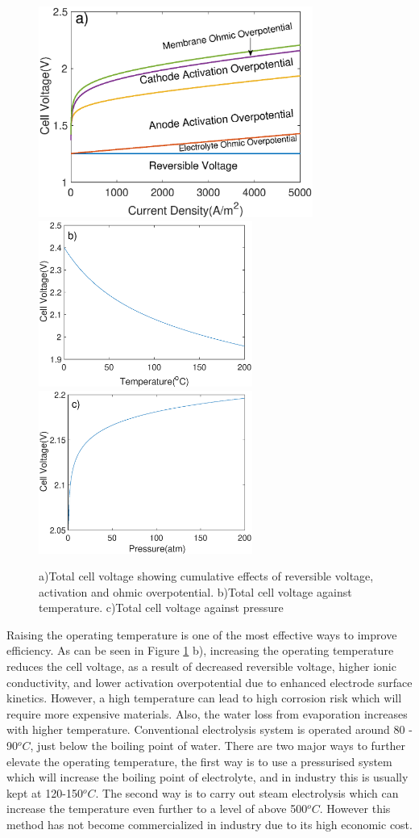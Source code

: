 \begin{figure}[h]
\centering
\includegraphics[width=9cm]{total.eps}
\newline
\includegraphics[width=7cm]{cellT.eps}
\includegraphics[width=7cm]{cellP.eps}
\caption{a)Total cell voltage showing cumulative effects of reversible voltage, activation and ohmic overpotential. b)Total cell voltage against temperature. c)Total cell voltage against pressure}
\label{fig:ni}
\end{figure}
Raising the operating temperature is one of the most effective ways to improve efficiency. As can be seen in Figure \ref{fig:ni} b), increasing the operating temperature reduces the cell voltage, as a result of decreased reversible voltage, higher ionic conductivity, and lower activation overpotential due to enhanced electrode surface kinetics. However, a high temperature can lead to high corrosion risk which will require more expensive materials. Also, the water loss from evaporation increases with higher temperature. Conventional electrolysis system is operated around 80 - 90$^oC$, just below the boiling point of water.\cite{temp} There are two major ways to further elevate the operating temperature, the first way is to use a pressurised system which will increase the boiling point of electrolyte, and in industry this is usually kept at 120-150$^oC$.\cite{temp} The second way is to carry out steam electrolysis which can increase the temperature even further to a level of above 500$^oC$.\cite{temp} However this method has not become commercialized in industry due to its high economic cost. \\
